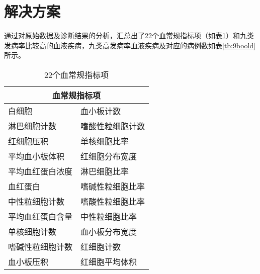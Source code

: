 \documentclass[UTF8,a4paper,12pt, onecolumn]{ctexart}
\begin{document}
\section{解决方案}

通过对原始数据及诊断结果的分析，汇总出了22个血常规指标项（如表\ref{tb:22metrics}）和九类发病率比较高的血液疾病，九类高发病率血液疾病及对应的病例数如表\ref{tb:9boold}所示。

\begin{table}
\centering
\begin{tabular}{|l|l|}
\toprule
\multicolumn{2}{|c|}{血常规指标项} \\
\midrule
白细胞		&	血小板计数	\\
淋巴细胞计数	&	嗜酸性粒细胞计数	\\
红细胞压积	&	单核细胞比率	\\
平均血小板体积	&	红细胞分布宽度	\\
平均血红蛋白浓度	&	淋巴细胞比率	\\
血红蛋白		&	嗜碱性粒细胞比率	\\
中性粒细胞计数	&	嗜酸性粒细胞比率	\\
平均血红蛋白含量	&	中性粒细胞比率	\\
单核细胞计数	&	血小板分布宽度	\\
嗜碱性粒细胞计数	&	红细胞计数	\\
血小板压积	&	红细胞平均体积	\\
\bottomrule
\end{tabular}
\caption{22个血常规指标项}
\label{tb:22metrics}
\end{table}
\end{document}
